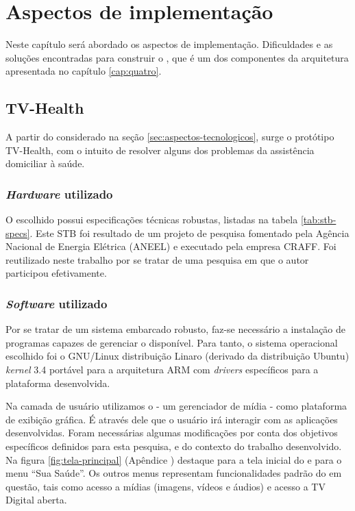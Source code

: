 \chapter{Aspectos de implementação} \label{cap:aspectos-de-implementacao}

Neste capítulo será abordado os aspectos de implementação. Dificuldades e as
soluções encontradas para construir o \software, que é um dos componentes
da arquitetura apresentada no capítulo \vref{cap:quatro}.

\section{TV-Health} \label{sec:tv-health} 

A partir do considerado na seção \ref{sec:aspectos-tecnologicos}, surge o
protótipo TV-Health, com o intuito de resolver alguns dos problemas da
assistência domiciliar à saúde.

\subsection{\textit{Hardware} utilizado}

O \stb[] escolhido possui especificações técnicas robustas, listadas na 
tabela \ref{tab:stb-specs}. Este STB foi resultado de um projeto de pesquisa
fomentado pela Agência Nacional de Energia Elétrica (ANEEL) e executado pela
empresa CRAFF. Foi reutilizado neste trabalho por se tratar de 
uma pesquisa em que o autor participou efetivamente.


\subsection{\textit{Software} utilizado}

Por se tratar de um sistema embarcado robusto, faz-se necessário a instalação
de programas capazes de gerenciar o \hardware[] disponível. Para tanto, o
sistema operacional escolhido foi o GNU/Linux distribuição Linaro (derivado da
distribuição Ubuntu) \textit{kernel} 3.4 portável para a arquitetura 
ARM com \textit{drivers} específicos para a plataforma desenvolvida.


Na camada de usuário utilizamos o \software[] \xbmc[] - um gerenciador de mídia
- como plataforma de exibição gráfica. É através dele que o usuário irá 
interagir com as aplicações desenvolvidas. Foram necessárias algumas 
modificações por conta dos objetivos específicos definidos para esta pesquisa,
e do contexto do trabalho desenvolvido. Na figura \ref{fig:tela-principal}
(Apêndice )
destaque para a tela inicial do \software[] \xbmc[] e para o menu ``Sua Saúde''.
Os outros menus representam funcionalidades padrão do \software[] em questão,
tais como acesso a mídias (imagens, vídeos e áudios) e acesso a TV Digital aberta.

